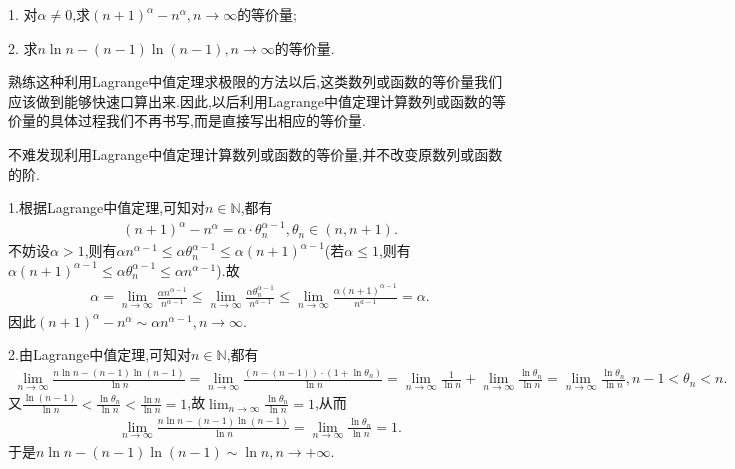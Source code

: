 \documentclass[../../main.tex]{subfiles}%
\begin{document}
\begin{example}

1. 对\(\alpha \neq 0\),求\((n + 1)^{\alpha} - n^{\alpha}, n \to \infty\)的等价量;

2. 求\(n \ln n - (n - 1) \ln (n - 1), n \to \infty\)的等价量.
\end{example}
\begin{note}
熟练这种利用Lagrange中值定理求极限的方法以后,这类数列或函数的等价量我们应该做到能够快速口算出来.因此,以后利用Lagrange中值定理计算数列或函数的等价量的具体过程我们不再书写,而是直接写出相应的等价量.
\end{note}
\begin{remark}
不难发现利用Lagrange中值定理计算数列或函数的等价量,并不改变原数列或函数的阶.
\end{remark}
\begin{solution}
1.根据Lagrange中值定理,可知对$n\in\mathbb{N}$,都有
\begin{align*}
(n + 1)^{\alpha} - n^{\alpha}=\alpha\cdot\theta _{n}^{\alpha -1},\theta _{n}\in(n,n+1).
\end{align*}
不妨设$\alpha>1$,则有$\alpha n^{\alpha -1}\leqslant \alpha \theta _{n}^{\alpha -1}\leqslant \alpha \left( n+1 \right) ^{\alpha -1}$(若$\alpha\leqslant 1$,则有$\alpha \left( n+1 \right) ^{\alpha -1}\leqslant \alpha \theta _{n}^{\alpha -1}\leqslant \alpha n^{\alpha -1}$).故
\begin{align*}
\alpha =\lim_{n\rightarrow \infty} \frac{\alpha n^{\alpha -1}}{n^{\alpha -1}}\leqslant \lim_{n\rightarrow \infty} \frac{\alpha \theta _{n}^{\alpha -1}}{n^{a-1}}\leqslant \lim_{n\rightarrow \infty} \frac{\alpha (n+1)^{\alpha -1}}{n^{a-1}}=\alpha.
\end{align*}
因此$(n+1)^{\alpha}-n^{\alpha}\sim \alpha n^{\alpha -1},n\rightarrow \infty$.

2.由Lagrange中值定理,可知对$n\in\mathbb{N}$,都有
\begin{align*}
\lim_{n \to \infty} \frac{n \ln n - (n - 1) \ln (n - 1)}{\ln n} = \lim_{n \to \infty} \frac{(n - (n - 1)) \cdot (1 + \ln \theta_n)}{\ln n}= \lim_{n \to \infty} \frac{1}{\ln n} + \lim_{n \to \infty} \frac{\ln \theta_n}{\ln n}=\lim_{n \to \infty} \frac{\ln \theta_n}{\ln n}, n - 1 < \theta_n < n.
\end{align*}
又\(\frac{\ln (n - 1)}{\ln n} < \frac{\ln \theta_n}{\ln n} < \frac{\ln n}{\ln n} = 1\),故\(\lim_{n \to \infty} \frac{\ln \theta_n}{\ln n} = 1\),从而
\begin{align*}
\lim_{n \to \infty} \frac{n \ln n - (n - 1) \ln (n - 1)}{\ln n} = \lim_{n \to \infty} \frac{\ln \theta_n}{\ln n}=1.
\end{align*}
于是\(n \ln n - (n - 1) \ln (n - 1) \sim \ln n,n\to+\infty\).

\end{solution}
\end{document}
